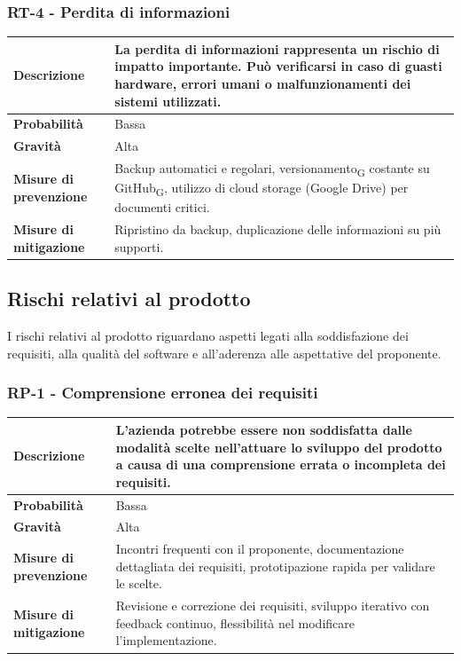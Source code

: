 \documentclass[11pt,a4paper]{article}
\newcommand{\gls}[1]{#1\textsubscript{G}}
\begin{document}
\subsubsection{RT-4 - Perdita di informazioni}
\begin{center}
\begin{tabular}{|p{3cm}|p{12cm}|}
    \hline
    \textbf{Descrizione} & La perdita di informazioni rappresenta un rischio di impatto importante. Può verificarsi in caso di guasti hardware, errori umani o malfunzionamenti dei sistemi utilizzati. \\
    \hline
    \textbf{Probabilità} & Bassa \\
    \hline
    \textbf{Gravità} & Alta \\
    \hline
    \textbf{Misure di prevenzione} & Backup automatici e regolari, \gls{versionamento} costante su \gls{GitHub}, utilizzo di cloud storage (Google Drive) per documenti critici. \\
    \hline
    \textbf{Misure di mitigazione} & Ripristino da backup, duplicazione delle informazioni su più supporti. \\
    \hline
\end{tabular}
\end{center}

\subsection{Rischi relativi al prodotto}
I rischi relativi al prodotto riguardano aspetti legati alla soddisfazione dei requisiti, alla qualità del software e all'aderenza alle aspettative del proponente.

\subsubsection{RP-1 - Comprensione erronea dei requisiti}
\begin{center}
\begin{tabular}{|p{3cm}|p{12cm}|}
    \hline
    \textbf{Descrizione} & L'azienda potrebbe essere non soddisfatta dalle modalità scelte nell'attuare lo sviluppo del prodotto a causa di una comprensione errata o incompleta dei requisiti. \\
    \hline
    \textbf{Probabilità} & Bassa \\
    \hline
    \textbf{Gravità} & Alta \\
    \hline
    \textbf{Misure di prevenzione} & Incontri frequenti con il proponente, documentazione dettagliata dei requisiti, prototipazione rapida per validare le scelte. \\
    \hline
    \textbf{Misure di mitigazione} & Revisione e correzione dei requisiti, sviluppo iterativo con feedback continuo, flessibilità nel modificare l'implementazione. \\
    \hline
\end{tabular}
\end{center}
\end{document}
